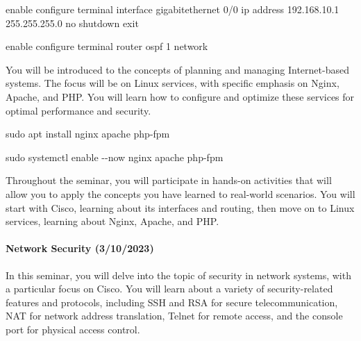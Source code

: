 \documentclass[
  letterpaper,
  DIV=11,
  numbers=noendperiod]{scrartcl}
\let\oldparagraph\paragraph
\renewcommand{\paragraph}[1]{\oldparagraph{#1}\mbox{}}
\newenvironment{Shaded}{\begin{snugshade}}{\end{snugshade}}
\newcommand{\AttributeTok}[1]{\textcolor[rgb]{0.40,0.45,0.13}{#1}}
\newcommand{\FunctionTok}[1]{\textcolor[rgb]{0.28,0.35,0.67}{#1}}
\newcommand{\NormalTok}[1]{\textcolor[rgb]{0.00,0.23,0.31}{#1}}
\begin{document}
\begin{Shaded}
\begin{Highlighting}[]
\NormalTok{enable}
\NormalTok{configure terminal}
\NormalTok{interface gigabitethernet 0/0}
\NormalTok{ip address 192.168.10.1 255.255.255.0}
\NormalTok{no shutdown}
\NormalTok{exit}
\end{Highlighting}
\end{Shaded}

\begin{Shaded}
\begin{Highlighting}[]
\NormalTok{enable}
\NormalTok{configure terminal}
\NormalTok{router ospf 1}
\NormalTok{network}
\end{Highlighting}
\end{Shaded}

You will be introduced to the concepts of planning and managing
Internet-based systems. The focus will be on Linux services, with
specific emphasis on Nginx, Apache, and PHP. You will learn how to
configure and optimize these services for optimal performance and
security.

\begin{Shaded}
\begin{Highlighting}[]
\FunctionTok{sudo}\NormalTok{ apt install nginx apache php{-}fpm}
\end{Highlighting}
\end{Shaded}

\begin{Shaded}
\begin{Highlighting}[]
\FunctionTok{sudo}\NormalTok{ systemctl enable }\AttributeTok{{-}{-}now}\NormalTok{ nginx apache php{-}fpm}
\end{Highlighting}
\end{Shaded}

Throughout the seminar, you will participate in hands-on activities that
will allow you to apply the concepts you have learned to real-world
scenarios. You will start with Cisco, learning about its interfaces and
routing, then move on to Linux services, learning about Nginx, Apache,
and PHP.

\hypertarget{network-security-3102023}{%
\paragraph{Network Security
(3/10/2023)}\label{network-security-3102023}}

In this seminar, you will delve into the topic of security in network
systems, with a particular focus on Cisco. You will learn about a
variety of security-related features and protocols, including SSH and
RSA for secure telecommunication, NAT for network address translation,
Telnet for remote access, and the console port for physical access
control.
\end{document}
